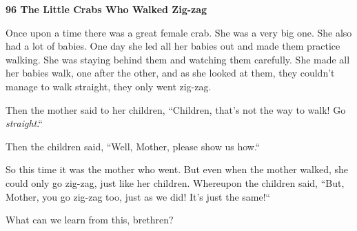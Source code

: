
\textbf{96 The Little Crabs Who Walked Zig-zag}

Once upon a time there was a great female crab. She was a very big one. She also
had a lot of babies. One day she led all her babies out and made them practice
walking. She was staying behind them and watching them carefully. She made all
her babies walk, one after the other, and as she looked at them, they couldn't
manage to walk straight, they only went zig-zag.

Then the mother said to her children, ``Children, that's not the way to
walk! Go \textit{straight}.``

Then the children said, ``Well, Mother, please show us how.``

So this time it was the mother who went. But even when the mother walked, she could
only go zig-zag, just like her children. Whereupon the children said, ``But,
Mother, you go zig-zag too, just as we did! It's just the same!``

What can we learn from this, brethren?


